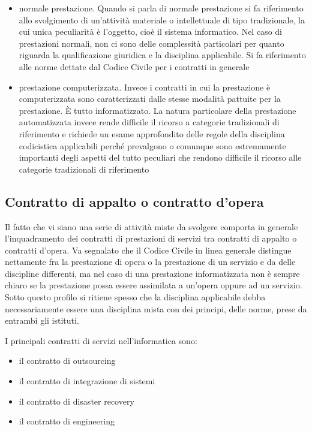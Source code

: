 \begin{itemize}
    \item normale prestazione. Quando si parla di normale prestazione si fa riferimento allo svolgimento di un'attività materiale o intellettuale di tipo tradizionale, la cui unica peculiarità è l'oggetto, cioè il sistema informatico. Nel caso di prestazioni normali, non ci sono delle complessità particolari per quanto riguarda la qualificazione giuridica e la disciplina applicabile. Si fa riferimento alle norme dettate dal Codice Civile per i contratti in generale
    \item prestazione computerizzata. Invece i contratti in cui la prestazione è computerizzata sono caratterizzati dalle stesse modalità pattuite per la prestazione. È tutto informatizzato. La natura particolare della prestazione automatizzata invece rende difficile il ricorso a categorie tradizionali di riferimento e richiede un esame approfondito delle regole della disciplina codicistica applicabili perché prevalgono o comunque sono estremamente importanti degli aspetti del tutto peculiari che rendono difficile il ricorso alle categorie tradizionali di riferimento
\end{itemize}

\subsection{Contratto di appalto o contratto d'opera} 
Il fatto che vi siano una serie di attività miste da svolgere comporta in generale l'inquadramento dei contratti di prestazioni di servizi tra contratti di appalto o contratti d'opera. Va segnalato che il Codice Civile in linea generale distingue nettamente fra la prestazione di opera o la prestazione di un servizio e da delle discipline differenti, ma nel caso di una prestazione informatizzata non è sempre chiaro se la prestazione possa essere assimilata a un'opera oppure ad un servizio. Sotto questo profilo si ritiene spesso che la disciplina applicabile debba necessariamente essere una disciplina mista con dei principi, delle norme, prese da entrambi gli istituti. 

I principali contratti di servizi nell'informatica sono:

\begin{itemize}
    \item il contratto di outsourcing
    \item il contratto di integrazione di sistemi
    \item il contratto di disaster recovery
    \item il contratto di engineering
\end{itemize}

